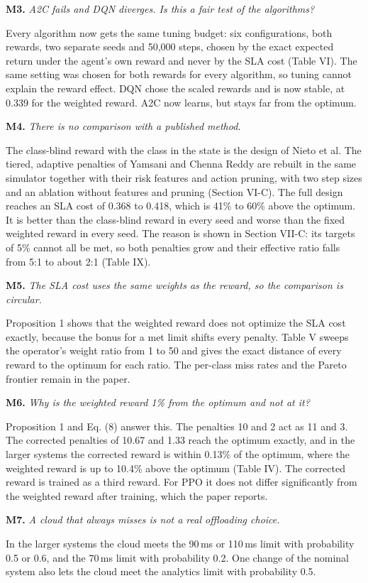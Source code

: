 \documentclass[11pt]{article}
\newcommand{\obj}[2]{\par\medskip\textbf{#1.} \emph{#2}\par}
\begin{document}
\obj{M3}{A2C fails and DQN diverges. Is this a fair test of the algorithms?}
Every algorithm now gets the same tuning budget: six configurations, both rewards, two separate seeds and 50,000 steps, chosen by the exact expected return under the agent's own reward and never by the SLA cost (Table VI). The same setting was chosen for both rewards for every algorithm, so tuning cannot explain the reward effect. DQN chose the scaled rewards and is now stable, at 0.339 for the weighted reward. A2C now learns, but stays far from the optimum.

\obj{M4}{There is no comparison with a published method.}
The class-blind reward with the class in the state is the design of Nieto et al. The tiered, adaptive penalties of Yamsani and Chenna Reddy are rebuilt in the same simulator together with their risk features and action pruning, with two step sizes and an ablation without features and pruning (Section VI-C). The full design reaches an SLA cost of 0.368 to 0.418, which is 41\% to 60\% above the optimum. It is better than the class-blind reward in every seed and worse than the fixed weighted reward in every seed. The reason is shown in Section VII-C: its targets of 5\% cannot all be met, so both penalties grow and their effective ratio falls from 5:1 to about 2:1 (Table IX).

\obj{M5}{The SLA cost uses the same weights as the reward, so the comparison is circular.}
Proposition 1 shows that the weighted reward does not optimize the SLA cost exactly, because the bonus for a met limit shifts every penalty. Table V sweeps the operator's weight ratio from 1 to 50 and gives the exact distance of every reward to the optimum for each ratio. The per-class miss rates and the Pareto frontier remain in the paper.

\obj{M6}{Why is the weighted reward 1\% from the optimum and not at it?}
Proposition 1 and Eq. (8) answer this. The penalties 10 and 2 act as 11 and 3. The corrected penalties of 10.67 and 1.33 reach the optimum exactly, and in the larger systems the corrected reward is within 0.13\% of the optimum, where the weighted reward is up to 10.4\% above the optimum (Table IV). The corrected reward is trained as a third reward. For PPO it does not differ significantly from the weighted reward after training, which the paper reports.

\obj{M7}{A cloud that always misses is not a real offloading choice.}
In the larger systems the cloud meets the 90\,ms or 110\,ms limit with probability 0.5 or 0.6, and the 70\,ms limit with probability 0.2. One change of the nominal system also lets the cloud meet the analytics limit with probability 0.5.
\end{document}
